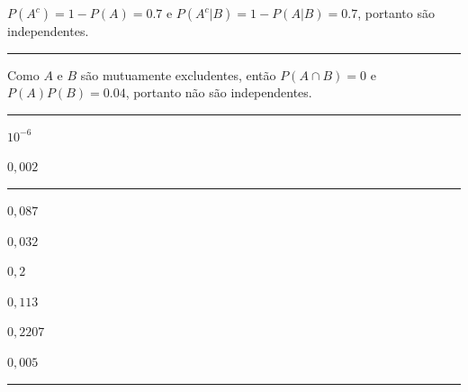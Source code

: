 \documentclass[a4paper,11pt,fleqn]{article}\usepackage[]{graphicx}\usepackage[]{color}
\theoremstyle{definition}
\begin{document}
\begin{compactenum}
\item $P(A^{c}) = 1 - P(A) = 0.7$ e $P(A^{c}|B) = 1 - P(A|B) = 0.7$,
  portanto são independentes.

\vspace{0.3cm}
\hrule
\vspace{0.3cm}

\item Como $A$ e $B$ são mutuamente excludentes, então $P(A \cap B) = 0$
  e $P(A)P(B) = 0.04$, portanto não são independentes.

\vspace{0.3cm}
\hrule
\vspace{0.3cm}

\item
  \begin{inparaenum}
  \item $10^{-6}$
  \item $0,002$
  \end{inparaenum}

\vspace{0.3cm}
\hrule
\vspace{0.3cm}

\item
  \begin{inparaenum}
  \item $0,087$
  \item $0,032$
  \item $0,2$
  \item $0,113$
  \item $0,2207$
  \item $0,005$
  \end{inparaenum}

\vspace{0.3cm}
\hrule
\vspace{0.3cm}


\end{compactenum}
\end{document}
